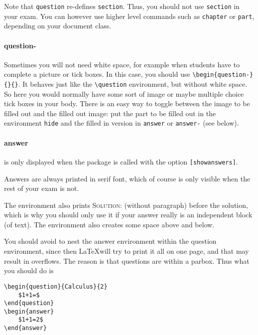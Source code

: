 \documentclass[a4paper]{scrartcl}
\begin{document}
Note that \verb|question| re-defines \verb|section|. Thus, you should not use  \verb|section| in your exam. You can however use higher level commands such as \verb|chapter| or \verb|part|, depending on your document class.

\paragraph{question-}

Sometimes you will not need white space, for example when students have to complete a picture or tick boxes. In this case, you should use \verb|\begin{question-}{}{}|. It behaves just like the \verb+\question+ environment, but without white space. So here you would normally have some sort of image or maybe multiple choice tick boxes in your body. There is an easy way to toggle between the image to be filled out and the filled out image: put the part to be filled out in the environment \verb|hide| and the filled in version in \verb|answer| or \verb|answer-| (see below).


\paragraph{answer}

is only displayed when the package is called with the option \verb+[showanswers]+. 

Answers are always printed in serif font, which of course is only visible when the rest of your exam is not. 

The environment also prints \textsc{Solution:} (without paragraph) before the solution, which is why you should only use it if your answer really is an independent block (of text). The  environment also creates some space above and below.

You should avoid to nest the answer environment within the question environment, since then \LaTeX will try to print it all on one page, and that may result in overflows. The reason is that questions are within a parbox. Thus what you should do is

\begin{verbatim}
\begin{question}{Calculus}{2}
    $1+1=$
\end{question}    
\begin{answer}
    $1+1=2$
\end{answer}
\end{verbatim}
\end{document}
